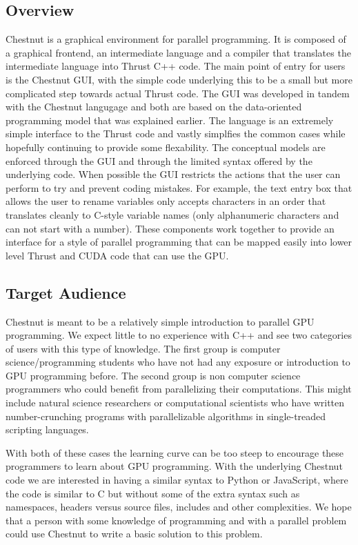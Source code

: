 \documentclass[twocolumn]{article}
\renewcommand{\|}{\origbar} %
\begin{document}
\subsection{Overview}

Chestnut is a graphical environment for parallel programming. It is composed of a graphical frontend, an intermediate language and a compiler that translates the intermediate language into Thrust C++ code. The main point of entry for users is the Chestnut GUI, with the simple code underlying this to be a small but more complicated step towards actual Thrust code. The GUI was developed in tandem with the Chestnut langugage and both are based on the data-oriented programming model that was explained earlier. The language is an extremely simple interface to the Thrust code and vastly simplfies the common cases while hopefully continuing to provide some flexability. The conceptual models are enforced through the GUI and through the limited syntax offered by the underlying code. When possible the GUI restricts the actions that the user can perform to try and prevent coding mistakes. For example, the text entry box that allows the user to rename variables only accepts characters in an order that translates cleanly to C-style variable names (only alphanumeric characters and can not start with a number). These components work together to provide an interface for a style of parallel programming that can be mapped easily into lower level Thrust and CUDA code that can use the GPU.

\subsection{Target Audience}
\label{sec:targetaudience}

Chestnut is meant to be a relatively simple introduction to parallel GPU programming. We expect little to no experience with C++ and see two categories of users with this type of knowledge. The first group is computer science/programming students who have not had any exposure or introduction to GPU programming before. The second group is non computer science programmers who could benefit from parallelizing their computations. This might include natural science researchers or computational scientists who have written number-crunching programs with parallelizable algorithms in single-treaded scripting languages.

With both of these cases the learning curve can be too steep to encourage these programmers to learn about GPU programming. With the underlying Chestnut code we are interested in having a similar syntax to Python or JavaScript, where the code is similar to C but without some of the extra syntax such as namespaces, headers versus source files, includes and other complexities. We hope that a person with some knowledge of programming and with a parallel problem could use Chestnut to write a basic solution to this problem.
\end{document}
